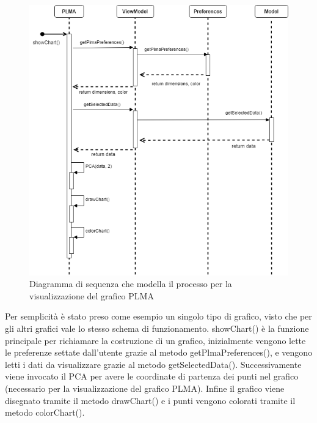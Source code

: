 \newpage
\begin{figure}[hb]
\includegraphics[width=15cm]{Images/Allegato Tecnico-Sequenza-PLMA}
\centering
\caption{Diagramma di sequenza che modella il processo per la visualizzazione del grafico PLMA}
\end{figure}
Per semplicità è stato preso come esempio un singolo tipo di grafico, visto che per gli altri grafici vale lo stesso schema di funzionamento.
showChart() è la funzione principale per richiamare la costruzione di un grafico, inizialmente vengono lette le preferenze settate dall'utente grazie al metodo getPlmaPreferences(), e vengono letti i dati da visualizzare grazie al metodo getSelectedData(). Successivamente viene invocato il PCA per avere le coordinate di partenza dei punti nel grafico (necessario per la visualizzazione del grafico PLMA). Infine il grafico viene disegnato tramite il metodo drawChart() e i punti vengono colorati tramite il metodo colorChart().

\newpage